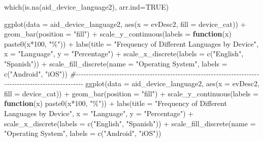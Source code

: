 \documentclass[
]{article}
\newenvironment{Shaded}{\begin{snugshade}}{\end{snugshade}}
\newcommand{\AttributeTok}[1]{\textcolor[rgb]{0.77,0.63,0.00}{#1}}
\newcommand{\CommentTok}[1]{\textcolor[rgb]{0.56,0.35,0.01}{\textit{#1}}}
\newcommand{\ConstantTok}[1]{\textcolor[rgb]{0.00,0.00,0.00}{#1}}
\newcommand{\ControlFlowTok}[1]{\textcolor[rgb]{0.13,0.29,0.53}{\textbf{#1}}}
\newcommand{\DecValTok}[1]{\textcolor[rgb]{0.00,0.00,0.81}{#1}}
\newcommand{\FunctionTok}[1]{\textcolor[rgb]{0.00,0.00,0.00}{#1}}
\newcommand{\NormalTok}[1]{#1}
\newcommand{\SpecialCharTok}[1]{\textcolor[rgb]{0.00,0.00,0.00}{#1}}
\newcommand{\StringTok}[1]{\textcolor[rgb]{0.31,0.60,0.02}{#1}}
\begin{document}
\begin{Shaded}
\begin{Highlighting}[]
\FunctionTok{which}\NormalTok{(}\FunctionTok{is.na}\NormalTok{(aid\_device\_language2), }\AttributeTok{arr.ind=}\ConstantTok{TRUE}\NormalTok{)}


\FunctionTok{ggplot}\NormalTok{(}\AttributeTok{data =}\NormalTok{ aid\_device\_language2, }\FunctionTok{aes}\NormalTok{(}\AttributeTok{x =}\NormalTok{ evDesc2, }\AttributeTok{fill =}\NormalTok{ device\_cat)) }\SpecialCharTok{+} 
  \FunctionTok{geom\_bar}\NormalTok{(}\AttributeTok{position =} \StringTok{"fill"}\NormalTok{) }\SpecialCharTok{+} 
  \FunctionTok{scale\_y\_continuous}\NormalTok{(}\AttributeTok{labels =} \ControlFlowTok{function}\NormalTok{(x) }\FunctionTok{paste0}\NormalTok{(x}\SpecialCharTok{*}\DecValTok{100}\NormalTok{, }\StringTok{"\%"}\NormalTok{)) }\SpecialCharTok{+} 
   \FunctionTok{labs}\NormalTok{(}\AttributeTok{title =} \StringTok{"Frequency of Different Languages by Device"}\NormalTok{, }
       \AttributeTok{x =} \StringTok{"Language"}\NormalTok{, }
       \AttributeTok{y =} \StringTok{"Percentage"}\NormalTok{) }\SpecialCharTok{+}
      \FunctionTok{scale\_x\_discrete}\NormalTok{(}\AttributeTok{labels =} \FunctionTok{c}\NormalTok{(}\StringTok{"English"}\NormalTok{, }\StringTok{"Spanish"}\NormalTok{)) }\SpecialCharTok{+}
      \FunctionTok{scale\_fill\_discrete}\NormalTok{(}\AttributeTok{name =} \StringTok{"Operating System"}\NormalTok{, }\AttributeTok{labels =} \FunctionTok{c}\NormalTok{(}\StringTok{"Android"}\NormalTok{, }\StringTok{"iOS"}\NormalTok{))  }
\CommentTok{\#{-}{-}{-}{-}{-}{-}{-}{-}{-}{-}{-}{-}{-}{-}{-}{-}{-}{-}{-}{-}{-}{-}{-}{-}{-}{-}{-}{-}{-}{-}{-}{-}{-}{-}{-}{-}{-}{-}{-}{-}{-}{-}{-}{-}{-}{-}{-}{-}{-}{-}{-}{-}{-}{-}{-}{-}{-}{-}{-}{-}{-}{-}{-}{-}{-}{-}{-}{-}{-}{-}{-}{-}{-}{-}{-}{-}{-}{-}{-}{-}{-}{-}{-}{-}{-}{-}{-}{-}{-}{-}{-}{-}{-}{-}{-}{-}{-}{-}{-}{-}{-}{-}{-}      }
\FunctionTok{ggplot}\NormalTok{(}\AttributeTok{data =}\NormalTok{ aid\_device\_language2, }\FunctionTok{aes}\NormalTok{(}\AttributeTok{x =}\NormalTok{ evDesc2, }\AttributeTok{fill =}\NormalTok{ device\_cat)) }\SpecialCharTok{+} 
  \FunctionTok{geom\_bar}\NormalTok{(}\AttributeTok{position =} \StringTok{"fill"}\NormalTok{) }\SpecialCharTok{+} 
  \FunctionTok{scale\_y\_continuous}\NormalTok{(}\AttributeTok{labels =} \ControlFlowTok{function}\NormalTok{(x) }\FunctionTok{paste0}\NormalTok{(x}\SpecialCharTok{*}\DecValTok{100}\NormalTok{, }\StringTok{"\%"}\NormalTok{)) }\SpecialCharTok{+} 
   \FunctionTok{labs}\NormalTok{(}\AttributeTok{title =} \StringTok{"Frequency of Different Languages by Device"}\NormalTok{, }
       \AttributeTok{x =} \StringTok{"Language"}\NormalTok{, }
       \AttributeTok{y =} \StringTok{"Percentage"}\NormalTok{) }\SpecialCharTok{+}
      \FunctionTok{scale\_x\_discrete}\NormalTok{(}\AttributeTok{labels =} \FunctionTok{c}\NormalTok{(}\StringTok{"English"}\NormalTok{, }\StringTok{"Spanish"}\NormalTok{)) }\SpecialCharTok{+}
      \FunctionTok{scale\_fill\_discrete}\NormalTok{(}\AttributeTok{name =} \StringTok{"Operating System"}\NormalTok{, }\AttributeTok{labels =} \FunctionTok{c}\NormalTok{(}\StringTok{"Android"}\NormalTok{, }\StringTok{"iOS"}\NormalTok{)) }


\end{Highlighting}
\end{Shaded}
\end{document}
